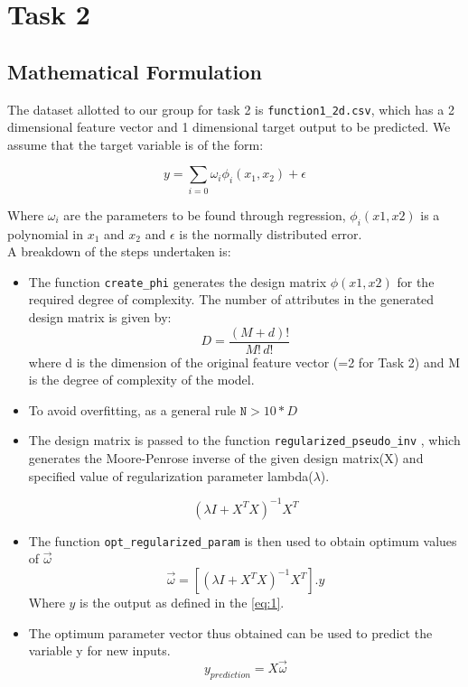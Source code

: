 \documentclass[12pt,a4paper]{article}
\newcommand{\noi}{\noindent}
\def\tt#1{\texttt{#1}}
\begin{document}
\section{Task 2}
\subsection{Mathematical Formulation}
The dataset allotted to our group for task 2 is \tt{function1\_2d.csv}, which has a 2 dimensional feature vector and 1 dimensional target output to be predicted. We assume that the target variable is of the form:

\begin{equation}
\label{eq:1}
    y=\sum_{i=0}\omega _{i}\phi_{i}(x_1,x_2)  +\epsilon 
\end{equation}

\noi
Where $\omega_{i}$ are the parameters to be found through regression, $\phi_{i}(x1,x2)$ is a polynomial in $x_1$ and $x_2$ and $\epsilon$ is the normally distributed error. 
\\ 

\noi
A breakdown of the steps undertaken is:
\begin{itemize}
    \itemsep0em
    \item The function \tt{create\_phi} generates the design matrix $\phi(x1,x2)$ for the required degree of complexity.
    The number of attributes in the generated design matrix is given by:
    \begin{equation}
        D=\frac{(M+d)!}{M!\,d!}
    \end{equation}
    where d is the dimension of the original feature vector (=2 for Task 2) and M is the degree of complexity of the model.
    \item To avoid overfitting, as a general rule $\tt{N}>10*D$
    \item The design matrix is passed to the function \tt{regularized\_pseudo\_inv} , which generates the Moore-Penrose inverse of the given design matrix(X) and specified value of regularization parameter lambda($\lambda$).
    
    \begin{equation}
         (\lambda I+X^{T}X)^{-1}X^{T}
    \end{equation}
    
    \item The function \tt{opt\_regularized\_param} is then used to obtain optimum values of $\vec{\omega}$
    \begin{equation}
        \vec{\omega} = [(\lambda I+X^{T}X)^{-1}X^{T}].y
    \end{equation}
    Where $y$ is the output as defined in the \autoref{eq:1}.
    
    \item The optimum parameter vector thus obtained can be used to predict the variable y for new inputs. 
    \begin{equation}
        y_{prediction}=X\vec{\omega}
    \end{equation}
\end{itemize}
\end{document}
